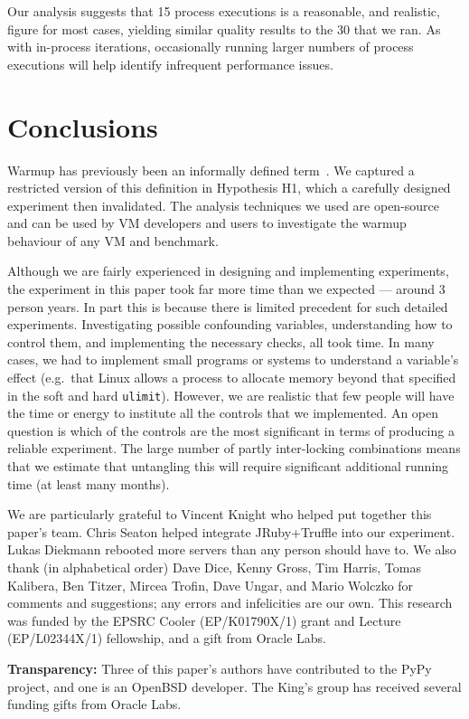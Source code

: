 \documentclass[acmsmall,screen]{acmart}
\begin{document}
Our analysis suggests that 15 process executions is a reasonable, and realistic, figure for most
cases, yielding similar quality results to the 30 that we ran. As with in-process
iterations, occasionally running larger numbers of process executions will help
identify infrequent performance issues.


\section{Conclusions}
\label{sec:conclusions}

Warmup has previously been an informally defined term~\cite{seaton15phd}. We
captured a restricted version of this definition in Hypothesis H1, which
a carefully designed experiment then invalidated. The analysis
techniques we used are open-source and can be used by VM developers and users to investigate the
warmup behaviour of any VM and benchmark.

Although we are fairly experienced in designing and implementing
experiments, the experiment in this paper took far more time than we expected
--- around 3 person years. In part this is because there is limited precedent for such detailed
experiments. Investigating possible confounding variables, understanding how to
control them, and implementing the necessary checks, all took time. In many
cases, we had to implement small programs or systems to understand a variable's
effect (e.g.~that Linux allows a process to allocate memory beyond that
specified in the soft and hard \texttt{ulimit}). However, we are realistic that
few people will have the time or energy to institute all the controls that we
implemented. An open question is which of the controls are the most significant
in terms of producing a reliable experiment. The large number of partly
inter-locking combinations means that we estimate that untangling this will
require significant additional running time (at least many months).


\begin{acks}
We are particularly grateful to Vincent Knight who helped put together this
paper's team. Chris Seaton helped integrate JRuby+Truffle into our experiment.
Lukas Diekmann rebooted more servers than any person should have to.
We also thank (in alphabetical order) Dave Dice, Kenny Gross, Tim Harris, Tomas Kalibera, Ben
Titzer, Mircea Trofin, Dave Ungar, and Mario Wolczko for comments and suggestions; any
errors and infelicities are our own. This research was funded by the EPSRC
Cooler (EP/K01790X/1) grant and Lecture (EP/L02344X/1) fellowship,
and a gift from Oracle Labs.

\textbf{Transparency:} Three of this paper's authors have contributed
to the PyPy project, and one is an OpenBSD developer. The
King's group has received several funding gifts from Oracle Labs.
\end{acks}
\end{document}
